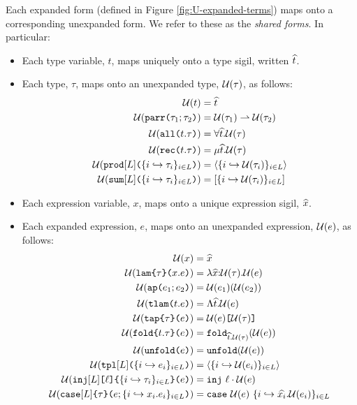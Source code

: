 Each expanded form (defined in Figure \ref{fig:U-expanded-terms}) maps onto a corresponding unexpanded form. We refer to these as the \emph{shared forms}. In particular:
\begin{itemize}
\item Each type variable, $t$, maps uniquely onto a {type sigil}, written $\widehat{t}$.
\item Each type, $\tau$, maps onto an unexpanded type, $\mathcal{U}(\tau)$, as follows: 
  \begin{align*}
  \mathcal{U}(t) &= \widehat{t}\\
  \mathcal{U}(\texttt{parr}\texttt{(}\tau_1; \tau_2\texttt{)}) & = \mathcal{U}(\tau_1) \rightharpoonup \mathcal{U}(\tau_2)\\
  \mathcal{U}(\texttt{all}\texttt{(}t.\tau\texttt{)}) & = \forall \widehat{t}.\mathcal{U}(\tau)\\
  \mathcal{U}(\texttt{rec}\texttt{(}t.\tau\texttt{)}) & = \mu \widehat{t}.\mathcal{U}(\tau)\\
  \mathcal{U}(\texttt{prod}[L]\texttt{(}\{i \hookrightarrow \tau_{i}\}_{i \in L}\texttt{)}) & = \langle \{i \hookrightarrow \mathcal{U}(\tau_{i})\}_{i \in L} \rangle\\
  \mathcal{U}(\texttt{sum}[L]\texttt{(}\{i \hookrightarrow \tau_{i}\}_{i \in L}\texttt{)}) & = [\{i \hookrightarrow \mathcal{U}(\tau_{i})\}_{i \in L}]
  \end{align*}
\item Each expression variable, $x$, maps onto a unique expression sigil, $\widehat{x}$.
\item Each expanded expression, $e$, maps onto an unexpanded expression, $\mathcal{U}(e)$, as follows:
\begin{align*}
\mathcal{U}(x) & = \widehat{x}\\
\mathcal{U}(\texttt{lam}\texttt{\{}\tau\texttt{\}(}x.e\texttt{)}) & = \lambda \widehat{x}{:}\mathcal{U}(\tau).\mathcal{U}(e)\\
\mathcal{U}(\texttt{ap}\texttt{(}e_1; e_2\texttt{)}) & = \mathcal{U}(e_1)(\mathcal{U}(e_2))\\
\mathcal{U}(\texttt{tlam}\texttt{(}t.e\texttt{)}) & = \Lambda \widehat{t}.\mathcal{U}(e)\\
\mathcal{U}(\texttt{tap}\texttt{\{}\tau\texttt{\}(}e\texttt{)}) & = \mathcal{U}(e)\texttt{[}\mathcal{U}(\tau)\texttt{]}\\
\mathcal{U}(\texttt{fold}\texttt{\{}t.\tau\texttt{\}(}e\texttt{)}) & = \texttt{fold}_{\widehat{t}.\mathcal{U}(\tau)}(\mathcal{U}(e))\\
\mathcal{U}(\texttt{unfold}\texttt{(}e\texttt{)}) & = \texttt{unfold}(\mathcal{U}(e))\\
\mathcal{U}(\texttt{tpl}[L]\texttt{(}\{i \hookrightarrow e_{i}\}_{i \in L}\texttt{)}) & = \langle \{i \hookrightarrow \mathcal{U}(e_{i})\}_{i \in L}\rangle\\
\mathcal{U}(\texttt{inj}[L]\texttt{[}\ell\texttt{]\{}\{i \hookrightarrow \tau_{i}\}_{i \in L}\texttt{\}(}e\texttt{)}) &= \texttt{inj}~\ell \cdot \mathcal{U}(e)\\
\mathcal{U}(\texttt{case}[L]\texttt{\{}\tau\texttt{\}(}e; \{i \hookrightarrow x_{i}.e_{i}\}_{i \in L}\texttt{)}) & = \texttt{case}~\mathcal{U}(e)~\{i \hookrightarrow \widehat{x_{i}}.\mathcal{U}(e_{i})\}_{i \in L}
\end{align*}
\end{itemize}


